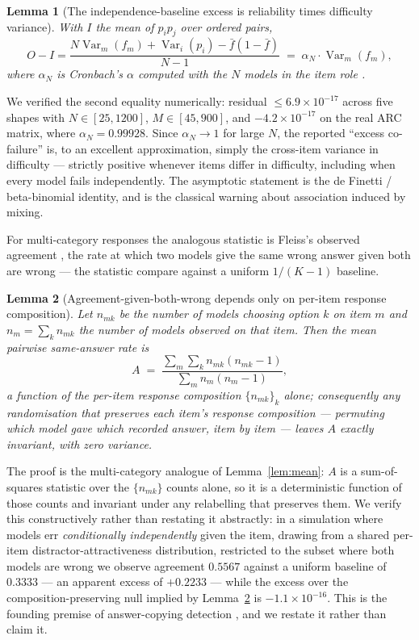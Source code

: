 \documentclass[pdflatex,sn-mathphys-ay]{sn-jnl}
\theoremstyle{thmstyleone}
\newtheorem{lemma}{Lemma}
\theoremstyle{thmstylethree}
\begin{document}
\begin{lemma}[The independence-baseline excess is reliability times difficulty variance]
\label{lem:alpha}
With $I$ the mean of $p_ip_j$ over ordered pairs,
\[
O-I=\frac{N\operatorname{Var}_m(f_m)+\operatorname{Var}_i(p_i)-\bar f(1-\bar f)}{N-1}
   \;=\;\alpha_N\cdot\operatorname{Var}_m(f_m),
\]
where $\alpha_N$ is Cronbach's $\alpha$ computed with the $N$ models in the item role
\citep{kuder1937,cronbach1951}.
\end{lemma}

\noindent We verified the second equality numerically: residual $\le 6.9\times10^{-17}$ across
five shapes with $N\in[25,1200]$, $M\in[45,900]$, and $-4.2\times10^{-17}$ on the real ARC
matrix, where $\alpha_N=0.99928$. Since $\alpha_N\to1$ for large $N$, the reported ``excess
co-failure'' is, to an excellent approximation, simply the cross-item variance in difficulty ---
strictly positive whenever items differ in difficulty, including when every model fails
independently. The asymptotic statement is the de Finetti / beta-binomial identity, and
\citet{yule1903} is the classical warning about association induced by mixing.

For multi-category responses the analogous statistic is Fleiss's observed agreement
\citep{fleiss1971}, the rate at which two models give the same wrong answer given both are wrong
--- the statistic \citet{kim2025correlated} compare against a uniform $1/(K-1)$ baseline.

\begin{lemma}[Agreement-given-both-wrong depends only on per-item response composition]
\label{lem:fleiss}
Let $n_{mk}$ be the number of models choosing option $k$ on item $m$ and $n_m=\sum_k n_{mk}$ the
number of models observed on that item. Then the mean pairwise same-answer rate is
\[
A \;=\; \frac{\sum_m\sum_k n_{mk}(n_{mk}-1)}{\sum_m n_m(n_m-1)},
\]
a function of the per-item response composition $\{n_{mk}\}_k$ alone; consequently any
randomisation that preserves each item's response composition --- permuting which model gave
which recorded answer, item by item --- leaves $A$ exactly invariant, with zero variance.
\end{lemma}

\noindent The proof is the multi-category analogue of Lemma~\ref{lem:mean}: $A$ is a
sum-of-squares statistic over the $\{n_{mk}\}$ counts alone, so it is a deterministic function of
those counts and invariant under any relabelling that preserves them. We verify this
constructively rather than restating it abstractly: in a simulation where models err
\emph{conditionally independently} given the item, drawing from a shared per-item
distractor-attractiveness distribution, restricted to the subset where both models are wrong we
observe agreement $0.5567$ against a uniform baseline of $0.3333$ --- an apparent excess of
$+0.2233$ --- while the excess over the composition-preserving null implied by
Lemma~\ref{lem:fleiss} is $-1.1\times10^{-16}$. This is the founding premise of answer-copying
detection \citep{wollack1997,vanderlinden2006}, and we restate it rather than claim it.
\end{document}
